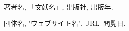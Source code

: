 \documentclass[a4j, 11pt, report]{jsarticle}
\begin{document}
\begin{thebibliography}{99}
    著者名, 「文献名」, 出版社, 出版年.

    団体名, "ウェブサイト名", URL, 閲覧日.
\end{thebibliography}
\end{document}

